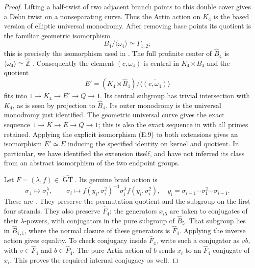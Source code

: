 \begin{proof}
Lifting a half-twist of two adjacent branch points to this double
cover gives a Dehn twist on a nonseparating curve.  Thus the Artin
action on $K_4$ is the based version of elliptic universal monodromy.
After removing base points its quotient is the familiar geometric
isomorphism
\[
 B_4/\langle\omega_4\rangle\simeq\Gamma_{1,2};
\]
this is precisely the isomorphism used in
\cite[Corollary C and the preceding paragraph]{ET_MN2022}.
The full profinite center of $\widehat B_4$ is
$\overline{\langle\omega_4\rangle}\simeq\widehat{\mathbb Z}$
\cite[\S2, equations (2.2) and (2.9)]{ET_MN2022}.
Consequently the element $(c,\omega_4)$ is central in
$K_4\rtimes\widehat B_4$ and the quotient
\[
 E'=(K_4\rtimes\widehat B_4)\big/
       \overline{\langle(c,\omega_4)\rangle}          \tag{E.12}
\]
fits into $1\to K_4\to E'\to Q\to1$.  Its central subgroup has
trivial intersection with $K_4$, as is seen by projection to
$\widehat B_4$.  Its outer monodromy is the universal monodromy just
identified.  The geometric universal curve gives the exact sequence
$1\to K\to E\to Q\to1$; this is also the exact sequence in
\cite[Theorem 6.13]{ET_HMTopicsI2012} with all primes retained.
Applying the explicit isomorphism (E.9) to both extensions gives an
isomorphism $E'\simeq E$ inducing the specified identity on kernel and
quotient.  In particular, we have identified the extension itself,
and have not inferred its class from an abstract isomorphism of
the two endpoint groups.

Let $F=(\lambda,f)\in\widehat{\operatorname{GT}}$.  Its genuine
braid action is
\[
 \sigma_1\mapsto\sigma_1^\lambda,
 \qquad
 \sigma_i\mapsto
 f(y_i,\sigma_i^2)^{-1}\sigma_i^\lambda f(y_i,\sigma_i^2),
 \quad y_i=\sigma_{i-1}\cdots\sigma_1^2\cdots\sigma_{i-1}.
                                                               \tag{E.13}
\]
These are \cite[\S0.1, equation (1)]{ET_HS2000}.  They preserve
the permutation quotient and the subgroup on the first four
strands.  They also preserve $\widehat F_4$: the generators $x_{i5}$
are taken to conjugates of their $\lambda$-powers, with conjugators
in the pure subgroup of $\widehat B_5$.  That subgroup lies in
$\widehat B_{4,1}$, where the normal closure of these generators is
$\widehat F_4$.  Applying the inverse action gives equality.
To check conjugacy inside $\widehat F_4$, write such a conjugator
as $vb$, with $v\in\widehat F_4$ and $b\in\widehat P_4$.
The pure Artin action of $b$ sends $x_i$ to an $\widehat F_4$-conjugate
of $x_i$.  This proves the required internal conjugacy as well.


\end{proof}

